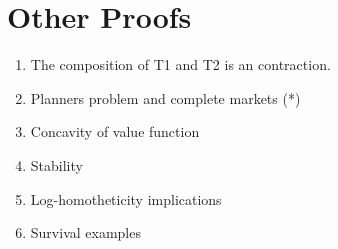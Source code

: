 \documentclass[12pt]{article}
\begin{document}
\section{Other Proofs}
\begin{enumerate}
\item The composition of T1 and T2 is an contraction.
\item Planners problem and complete markets (*)
\item Concavity of value function
\item Stability
\item Log-homotheticity implications
\item Survival examples

\end{enumerate}
 
\end{document}
